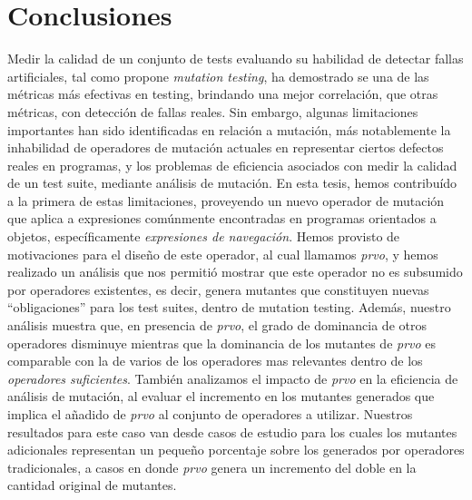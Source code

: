 \chapter[Conclusiones]{Conclusiones}
\label{cap:conclutions}

Medir la calidad de un conjunto de tests evaluando su habilidad de detectar fallas artificiales, tal como propone \emph{mutation testing}, ha demostrado se una de las m\'etricas m\'as efectivas en testing, brindando una mejor correlaci\'on, que otras m\'etricas, con detecci\'on de fallas reales. Sin embargo, algunas limitaciones importantes han sido identificadas en relaci\'on a mutaci\'on, m\'as notablemente la inhabilidad de operadores de mutaci\'on actuales en representar ciertos defectos reales en programas, y los problemas de eficiencia asociados con medir la calidad de un test suite, mediante an\'alisis de mutaci\'on. En esta tesis, hemos contribu\'ido a la primera de estas limitaciones, proveyendo un nuevo operador de mutaci\'on que aplica a expresiones com\'unmente encontradas en programas orientados a objetos, espec\'ificamente \emph{expresiones de navegaci\'on}. Hemos provisto de motivaciones para el dise\~no de este operador, al cual llamamos \emph{prvo}, y hemos realizado un an\'alisis que nos permiti\'o mostrar que este operador no es subsumido por operadores existentes, es decir, genera mutantes que constituyen nuevas ``obligaciones'' para los test suites, dentro de mutation testing. Adem\'as, nuestro an\'alisis muestra que, en presencia de \emph{prvo}, el grado de dominancia de otros operadores disminuye mientras que la dominancia de los mutantes de \emph{prvo} es comparable con la de varios de los operadores mas relevantes dentro de los \emph{operadores suficientes}. Tambi\'en analizamos el impacto de \emph{prvo} en la eficiencia de an\'alisis de mutaci\'on, al evaluar el incremento en los mutantes generados que implica el a\~nadido de \emph{prvo} al conjunto de operadores a utilizar. Nuestros resultados para este caso van desde casos de estudio para los cuales los mutantes adicionales representan un peque\~no porcentaje sobre los generados por operadores tradicionales, a casos en donde \emph{prvo} genera un incremento del doble en la cantidad original de mutantes.